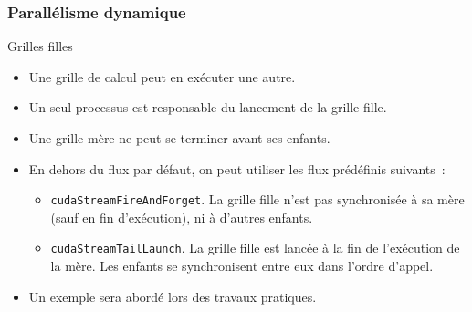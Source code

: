 \begin{frame}
    \frametitle{Parallélisme dynamique}
\begin{block}{Grilles filles}
 \begin{itemize}
    \item<+-> Une grille de calcul peut en exécuter une autre.
    \item<+-> Un seul processus est responsable du lancement de la grille fille.
    \item<+-> Une grille mère ne peut se terminer avant ses enfants.
    \item<+-> En dehors du flux par défaut, on peut utiliser les flux prédéfinis suivants~:
    \begin{itemize}
        \item<+-> \texttt{cudaStreamFireAndForget}. La grille fille n'est pas synchronisée à sa mère (sauf en fin d'exécution), ni à d'autres enfants.
        \item<+-> \texttt{cudaStreamTailLaunch}. La grille fille est lancée à la fin de l'exécution de la mère. Les enfants se synchronisent entre eux dans l'ordre
        d'appel.
    \end{itemize}
    \item<+-> Un exemple sera abordé lors des travaux pratiques.
 \end{itemize} 
\end{block}
\end{frame}